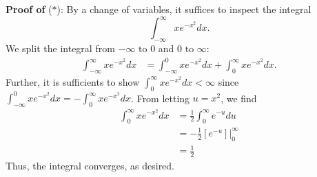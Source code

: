 \documentclass{article}
\begin{document}
\begin{itemize}
\begin{itemize}
        \textbf{Proof of }($\ast$): By a change of variables, it suffices to inspect the integral 
        \[\int_{-\infty}^{\infty}xe^{-x^2}dx.\]
        We split the integral from $-\infty \text{ to } 0$ and $0 \text{ to } \infty$:
        \begin{align*}
            \int_{-\infty}^{\infty}xe^{-x^2}dx &= \int_{-\infty}^{0}xe^{-x^2}dx + \int_0^{\infty} xe^{-x^2}dx.
        \end{align*}
        Further, it is sufficients to show ${\displaystyle \int_0^{\infty}xe^{-x^2}dx < \infty }$ since ${\displaystyle \int_{-\infty}^{0}xe^{-x^2} dx = -\int_{0}^{\infty}xe^{-x^2}}dx$. From letting $u = x^2$, we find
        \begin{align*}
            \int_0^{\infty} xe^{-x^2}dx &= \frac{1}{2}\int_{0}^{\infty}e^{-u}du\\
            &= -\frac{1}{2}[e^{-u}]\bigg|_0^{\infty}\\
            &= \frac{1}{2}
        \end{align*}
        Thus, the integral converges, as desired.
        

        
    \end{itemize}
\end{itemize}
\end{document}
